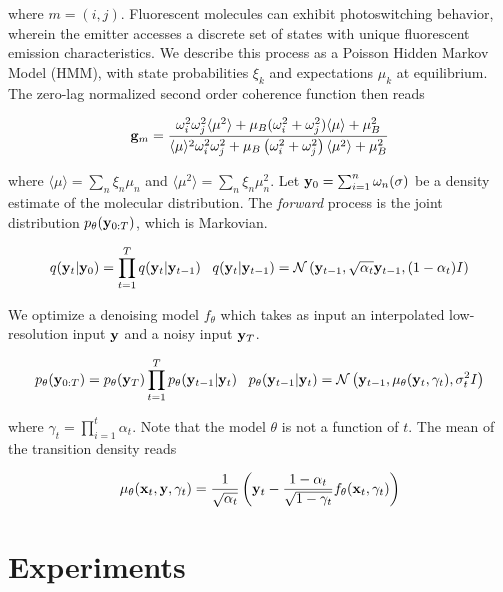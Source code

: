 \documentclass{article}
\begin{document}
where $m=(i,j)$. Fluorescent molecules can exhibit photoswitching behavior, wherein the emitter accesses a discrete set of states with unique fluorescent emission characteristics. We describe this process as a Poisson Hidden Markov Model (HMM), with state probabilities $\xi_{k}$ and expectations $\mu_{k}$ at equilibrium. The zero-lag normalized second order coherence function then reads

\begin{equation}
\bold{g}_{m} = \frac{\omega_{i}^{2}\omega_{j}^{2}\langle \mu^2 \rangle + \mu_{B}(\omega_{i}^{2}+\omega_{j}^{2})\langle \mu \rangle + \mu_{B}^2}{\langle \mu \rangle^2 \omega_{i}^2 \omega_{j}^2 + \mu_{B}\left(\omega_{i}^2+\omega_{j}^2\right)\langle \mu^2 \rangle + \mu_{B}^2}
\end{equation}

where $\langle \mu \rangle = \sum_{n}\xi_n\mu_n$ and $\langle \mu^2 \rangle = \sum_{n}\xi_n\mu_n^2$. Let $\bold{y}_{0} = \sum_{i=1}^{n} \bold{\omega}_{n}(\sigma)$ be a density estimate of the molecular distribution. The \emph{forward} process is the joint distribution $p_{\theta}(\bold{y}_{0:T})$, which is Markovian. 

\begin{equation}
q(\bold{y}_{t}|\bold{y}_{0}) = \prod_{t=1}^{T}q(\bold{y}_{t}|\bold{y}_{t-1}) \;\;\; q(\bold{y}_{t}|\bold{y}_{t-1}) = \mathcal{N}\left(\bold{y}_{t-1},\sqrt{\alpha_{t}}\bold{y}_{t-1},(1-\alpha_{t})I\right)
\end{equation}

We optimize a denoising model $f_{\theta}$ which takes as input an interpolated low-resolution input $\bold{y}$ and a noisy input $\bold{y}_{T}$. 

\begin{equation}
p_{\theta}(\bold{y}_{0:T}) = p_{\theta}(\bold{y}_{T})\prod_{t=1}^{T} p_{\theta}(\bold{y}_{t-1}|\bold{y}_{t}) \;\;\; p_{\theta}(\bold{y}_{t-1}|\bold{y}_{t}) = \mathcal{N}\left(\bold{y}_{t-1},\mu_{\theta}(\bold{y}_{t},\gamma_{t}),\sigma^{2}_{t}I\right)
\end{equation}

where $\gamma_{t}=\prod_{i=1}^{t}\alpha_{t}$. Note that the model $\theta$ is not a function of $t$. The mean of the transition density reads

\begin{equation}
\mu_{\theta}(\bold{x}_{t},\bold{y},\gamma_{t}) = \frac{1}{\sqrt{\alpha_{t}}}\left(\bold{y}_t-\frac{1-\alpha_{t}}{\sqrt{1-\gamma_{t}}}f_{\theta}(\bold{x}_{t},\gamma_{t})\right)
\end{equation}

\section{Experiments}
\end{document}
